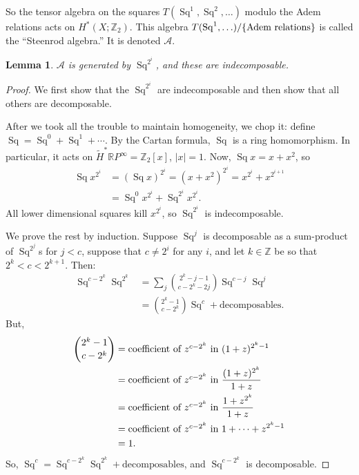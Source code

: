 \documentclass{article}
\newcommand{\Z}{\mathbb{Z}}
\newcommand{\R}{\mathbb{R}}
\newcommand{\RP}{\R P}
\newcommand{\SA}{\mathcal{A}}
\DeclareMathOperator{\Sq}{Sq}
\newtheorem{lem}[thm]{Lemma}
\begin{document}
So the tensor algebra on the squares $T(\Sq^1, \Sq^2, \ldots)$ modulo the Adem relations acts on $H^*(X; \Z_2)$.  This algebra $T(\Sq^1, \ldots) / \{\hbox{Adem relations}\}$ is called the ``Steenrod algebra.''  It is denoted $\SA$.
\begin{lem}
$\SA$ is generated by $\Sq^{2^i}$, and these are indecomposable.
\end{lem}
\begin{proof}
We first show that the $\Sq^{2^i}$ are indecomposable and then show that all others are decomposable.

After we took all the trouble to maintain homogeneity, we chop it: define $\Sq = \Sq^0 + \Sq^1 + \cdots$.  By the Cartan formula, $\Sq$ is a ring homomorphism.  In particular, it acts on $\widetilde H^* \RP^\infty = \Z_2[x]$, $|x| = 1$.  Now, $\Sq x = x + x^2$, so
\begin{align*}
\Sq x^{2^i} & = (\Sq x)^{2^i} = (x + x^2)^{2^i} = x^{2^i} + x^{2^{i+1}} \\
& = \Sq^0 x^{2^i} + \Sq^{2^i} x^{2^i}.
\end{align*}
All lower dimensional squares kill $x^{2^i}$, so $\Sq^{2^i}$ is indecomposable.

We prove the rest by induction.  Suppose $\Sq^j$ is decomposable as a sum-product of $\Sq^{2^j}$s for $j < c$, suppose that $c \ne 2^i$ for any $i$, and let $k \in \Z$ be so that $2^k < c < 2^{k+1}$.  Then:
\begin{align*}
\Sq^{c-2^k} \Sq^{2^k} & = \sum_j \binom{2^k - j - 1}{c-2^k-2j} \Sq^{c-j}\Sq^j \\
& = \binom{2^k - 1}{c-2^k} \Sq^c + \mathrm{decomposables}.
\end{align*}
But,
\begin{align*}
\binom{2^k-1}{c-2^k} & = \hbox{coefficient of $z^{c-2^k}$ in}\ (1 + z)^{2^k-1} \\
& = \hbox{coefficient of $z^{c-2^k}$ in}\ \frac{(1+z)^{2^k}}{1+z} \\
& = \hbox{coefficient of $z^{c-2^k}$ in}\ \frac{1 + z^{2^k}}{1+z} \\
& = \hbox{coefficient of $z^{c-2^k}$ in}\ 1 + \cdots + z^{2^k - 1} \\
& = 1.
\end{align*}
So, $\Sq^c = \Sq^{c-2^k} \Sq^{2^k} + \mathrm{decomposables}$, and $\Sq^{c - 2^k}$ is decomposable.
\end{proof}
\end{document}
